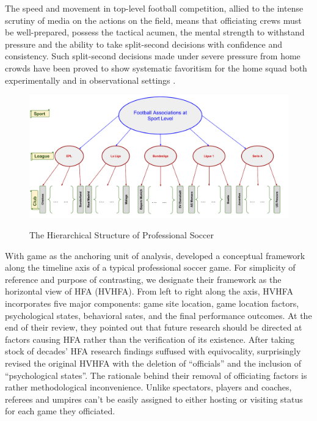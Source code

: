 \documentclass[USenglish]{article}
\begin{document}
The speed and movement in top-level football competition, allied to the intense scrutiny of media on the actions on the field, means that officiating crews must be well-prepared, possess the tactical acumen, the mental strength to withstand pressure and the ability to take split-second decisions with confidence and consistency. Such split-second decisions made under severe pressure from home crowds have been proved to show systematic favoritism for the home squad   
both experimentally \citep{Nevill1999, Nevill2002} and in observational settings \citep{Nevill1996, DOHMEN2008}.
\begin{figure}
\caption{The Hierarchical Structure of Professional Soccer }
{\includegraphics[width=1.0\linewidth]{HFA_22}}
\label{fig21}
\end{figure} 


With game as the anchoring unit of analysis, \cite{Courneya1992} developed a conceptual framework along the timeline axis of a typical professional soccer game. For simplicity of reference and purpose of contrasting, we designate their framework as the horizontal view of HFA (HVHFA). From left to right along the axis, HVHFA incorporates five major components: game site location, game location factors, psychological states, behavioral sates, and the final performance outcomes. At the end of their review, they pointed out that future research should be directed at factors causing HFA rather than the verification of its existence. After taking stock of decades' HFA research findings suffused with equivocality, \cite{Carron2005} surprisingly revised the original HVHFA with the deletion of ``officials'' and the inclusion of ``psychological states''. The rationale behind their removal of officiating factors is rather methodological inconvenience. Unlike spectators, players and coaches, referees and umpires can't be easily assigned to either hosting or visiting status for each game they officiated. 
\end{document}
